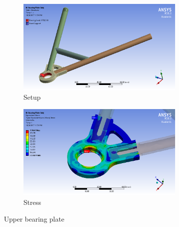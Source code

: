 \documentclass[10pt]{article}
\begin{document}
\begin{figure}[H]
\centering
\begin{subfigure}[b]{.48\textwidth}
\centering
\includegraphics[width=0.9\textwidth]{figures/fea/parts/MS00030-UpperBearingPlate-Setup}
\caption{Setup}
\end{subfigure}
\begin{subfigure}[b]{.48\textwidth}
\centering
\includegraphics[width=0.9\textwidth]{figures/fea/parts/MS00030-UpperBearingPlate-Stress}
\caption{Stress}
\end{subfigure}
\caption{Upper bearing plate}
\label{fig:MS00030-UpperBearingPlate}
\end{figure}
\end{document}
